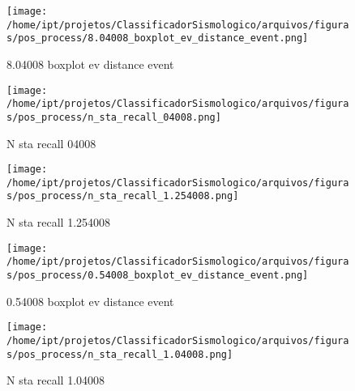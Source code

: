 
                    \begin{figure}[H]
                        \centering
                        \texttt{[image: /home/ipt/projetos/ClassificadorSismologico/arquivos/figuras/pos\_process/8.04008\_boxplot\_ev\_distance\_event.png]}
                        \caption{8.04008 boxplot ev distance event}
                        \label{fig:8.04008_boxplot_ev_distance_event}
                    \end{figure}
                

                    \begin{figure}[H]
                        \centering
                        \texttt{[image: /home/ipt/projetos/ClassificadorSismologico/arquivos/figuras/pos\_process/n\_sta\_recall\_04008.png]}
                        \caption{N sta recall 04008}
                        \label{fig:n_sta_recall_04008}
                    \end{figure}
                

                    \begin{figure}[H]
                        \centering
                        \texttt{[image: /home/ipt/projetos/ClassificadorSismologico/arquivos/figuras/pos\_process/n\_sta\_recall\_1.254008.png]}
                        \caption{N sta recall 1.254008}
                        \label{fig:n_sta_recall_1.254008}
                    \end{figure}
                

                    \begin{figure}[H]
                        \centering
                        \texttt{[image: /home/ipt/projetos/ClassificadorSismologico/arquivos/figuras/pos\_process/0.54008\_boxplot\_ev\_distance\_event.png]}
                        \caption{0.54008 boxplot ev distance event}
                        \label{fig:0.54008_boxplot_ev_distance_event}
                    \end{figure}
                

                    \begin{figure}[H]
                        \centering
                        \texttt{[image: /home/ipt/projetos/ClassificadorSismologico/arquivos/figuras/pos\_process/n\_sta\_recall\_1.04008.png]}
                        \caption{N sta recall 1.04008}
                        \label{fig:n_sta_recall_1.04008}
                    \end{figure}
                

